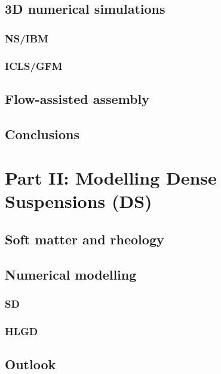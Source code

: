 \hypertarget{simulation1}{%
  \subsection{3D numerical simulations}}

\hypertarget{ibm}{%
  \subsubsection{NS/IBM}}

\hypertarget{icls}{%
  \subsubsection{ICLS/GFM}}

\hypertarget{assembly}{%
  \subsection{Flow-assisted assembly}}

\hypertarget{conclusion1}{%
  \subsection{Conclusions}}


\hypertarget{part2}{%
  \section{Part II: Modelling Dense Suspensions (DS)}}

\hypertarget{background2}{%
  \subsection{Soft matter and rheology}}

\hypertarget{simulation2}{%
  \subsection{Numerical modelling}}

\hypertarget{sd}{%
  \subsubsection{SD}}

\hypertarget{hlgd}{%
  \subsubsection{HLGD}}

\hypertarget{conclusion2}{%
  \subsection{Outlook}}

